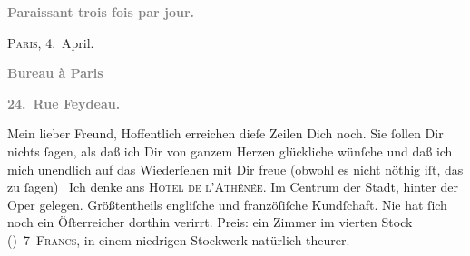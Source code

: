 \begin{ledgroupsized}[t]{13cm}
           \pstart
           \begin{otherlanguage}{french}\textcolor{gray}{\textbf{\textbf{Paraissant trois fois par jour.}}}\end{otherlanguage}\hfill \textsc{Paris}, 4. April.\pend
           \pstart
           \begin{otherlanguage}{french}\textcolor{gray}{\textbf{\textbf{Bureau à Paris}}}\end{otherlanguage}\pend
           \pstart
           \begin{otherlanguage}{french}\textcolor{gray}{\textbf{\textbf{24. Rue Feydeau.}}}\end{otherlanguage}\pend
           \pstart\center{}Mein lieber Freund,\pend\pstart
           Hoffentlich erreichen dieſe Zeilen Dich noch. Sie ſollen Dir nichts ſagen, als daß
               ich Dir von ganzem Herzen glückliche \label{K_L02807-1v}\label{K_L02807-1h} wünſche und daß ich mich unendlich auf das
               Wiederſehen mit Dir freue (obwohl es nicht nöthig iſt, das zu ſagen) {\dotsfour}\pend
           \pstart
           Ich denke ans \textsc{Hotel de l’Athénée}. Im Centrum der Stadt,
               hinter der Oper gelegen.
               Größtentheils engliſche und franzöſiſche Kundſchaft. Nie hat
               ſich noch ein {\pb}Öſterreicher dorthin verirrt. Preis: ein Zimmer
               im vierten Stock (\label{K_L02807-2v}\label{K_L02807-2h}) 7 \textsc{Francs}, in einem niedrigen Stockwerk natürlich theurer.

\end{ledgroupsized}
